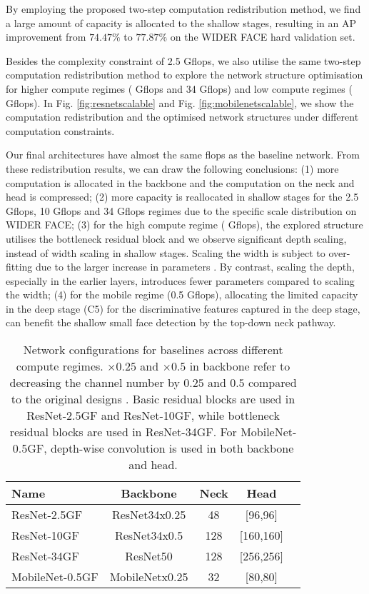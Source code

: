 \documentclass[10pt,twocolumn,letterpaper]{article}
\begin{document}
By employing the proposed two-step computation redistribution method, we find a large amount of capacity is allocated to the shallow stages, resulting in an AP improvement from $74.47\%$ to $77.87\%$ on the WIDER FACE hard validation set.

Besides the complexity constraint of 2.5 Gflops, we also utilise the same two-step computation redistribution method to explore the network structure optimisation for higher compute regimes ( Gflops and 34 Gflops) and low compute regimes ( Gflops). In Fig. \ref{fig:resnetscalable} and Fig. \ref{fig:mobilenetscalable}, we show the computation redistribution and the optimised network structures under different computation constraints.

Our final architectures have almost the same flops as the baseline network. From these redistribution results, we can draw the following conclusions: (1) more computation is allocated in the backbone and the computation on the neck and head is compressed; (2) more capacity is reallocated in shallow stages for the 2.5 Gflops, 10 Gflops and 34 Gflops regimes due to the specific scale distribution on WIDER FACE; (3) for the high compute regime ( Gflops), the explored structure utilises the bottleneck residual block and we observe significant depth scaling, instead of width scaling in shallow stages. Scaling the width is subject to over-fitting due to the larger increase in parameters \cite{Revisiting2021ResNets}. By contrast, scaling the depth, especially in the earlier layers, introduces fewer parameters compared to scaling the width; (4) for the mobile regime (0.5 Gflops), allocating the limited capacity in the deep stage (\eg C5) for the discriminative features captured in the deep stage, can benefit the shallow small face detection by the top-down neck pathway.

\begin{table}[t!]
\small
\centering
\begin{tabular}{l|cccc}
\hline
Name  & Backbone & Neck & Head  \\
\hline\hline
ResNet-2.5GF        & ResNet34x0.25  & 48   & [96,96]\\
ResNet-10GF         & ResNet34x0.5  & 128  & [160,160]\\
ResNet-34GF         & ResNet50  & 128  & [256,256]\\
\hline
MobileNet-0.5GF     & MobileNetx0.25 & 32   & [80,80]\\
\hline
\end{tabular}
\hspace{1in}
\caption{Network configurations for baselines across different compute regimes. 
$\times 0.25$ and $\times 0.5$ in backbone refer to decreasing the channel number by $0.25$ and $0.5$ compared to the original designs \cite{he2016deep,howard2017mobilenets}. Basic residual blocks are used in ResNet-2.5GF and ResNet-10GF, while bottleneck residual blocks are used in ResNet-34GF. For MobileNet-0.5GF, depth-wise convolution is used in both backbone and head.}
\label{tab:baselines}
\vspace{-4mm}
\end{table}
\end{document}
